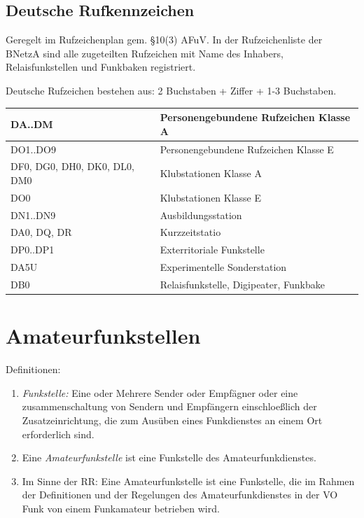 \documentclass[11pt,BCOR=8.5mm]{scrartcl}
\begin{document}
\subsection{Deutsche Rufkennzeichen}\label{sub:deutsche_rufkennzeichen}
Geregelt im Rufzeichenplan gem. §10(3) AFuV. In der Rufzeichenliste der
BNetzA sind alle zugeteilten Rufzeichen mit Name des Inhabers,
Relaisfunkstellen und Funkbaken registriert.

Deutsche Rufzeichen bestehen aus: 2 Buchstaben + Ziffer + 1-3
Buchstaben.

\begin{table}[h]
  \centering
\begin{tabular}{|l|l|}
  \hline
  DA..DM & Personengebundene Rufzeichen Klasse A\\
  \hline
  DO1..DO9 & Personengebundene Rufzeichen Klasse E\\
  \hline
  DF0, DG0, DH0, DK0, DL0, DM0 & Klubstationen Klasse A \\
  \hline
  DO0 & Klubstationen Klasse E \\
  \hline
  DN1..DN9 & Ausbildungsstation \\
  \hline
  DA0, DQ, DR & Kurzzeitstatio \\
  \hline
  DP0..DP1 & Exterritoriale Funkstelle \\
  \hline
  DA5U & Experimentelle Sonderstation \\
  \hline
  DB0 & Relaisfunkstelle, Digipeater, Funkbake\\
  \hline
\end{tabular}
\end{table}

\section{Amateurfunkstellen}\label{sec:amateurfunkstellen}
Definitionen:
\begin{enumerate}
  \item \emph{Funkstelle:} Eine oder Mehrere Sender oder Empfägner oder
    eine zusammenschaltung von Sendern und Empfängern einschloeßlich der
    Zusatzeinrichtung, die zum Ausüben eines Funkdienstes an einem Ort
    erforderlich sind.
  \item Eine \emph{Amateurfunkstelle} ist eine Funkstelle des
    Amateurfunkdienstes.
  \item Im Sinne der RR: Eine Amateurfunkstelle ist eine Funkstelle, die
    im Rahmen der Definitionen und der Regelungen des
    Amateurfunkdienstes in der VO Funk von einem Funkamateur betrieben
    wird.
\end{enumerate}
\end{document}
